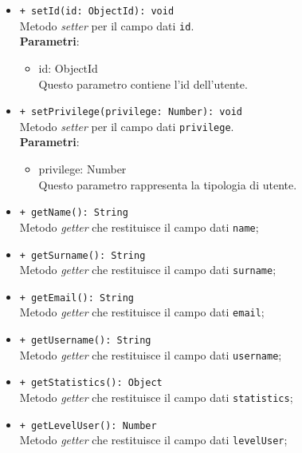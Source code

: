 \begin{itemize}
\begin{itemize}
				\item \texttt{+ setId(id: ObjectId): void} \\
				Metodo \textit{setter} per il campo dati \texttt{id}.\\
				\textbf{Parametri}:
				\begin{itemize}
					\item {id: ObjectId}\\
					Questo parametro contiene l'id dell'utente.
				\end{itemize}
				
				\item \texttt{+ setPrivilege(privilege: Number): void} \\
				Metodo \textit{setter} per il campo dati \texttt{privilege}.\\
				\textbf{Parametri}:
				\begin{itemize}
					\item {privilege: Number}\\
					Questo parametro rappresenta la tipologia di utente.
				\end{itemize}
				
				\item \texttt{+ getName(): String} \\
				Metodo \textit{getter} che restituisce il campo dati \texttt{name};
				
				\item \texttt{+ getSurname(): String} \\
				Metodo \textit{getter} che restituisce il campo dati \texttt{surname};
				
				\item \texttt{+ getEmail(): String} \\
				Metodo \textit{getter} che restituisce il campo dati \texttt{email};
				
				\item \texttt{+ getUsername(): String} \\
				Metodo \textit{getter} che restituisce il campo dati \texttt{username};
				
				\item \texttt{+ getStatistics(): Object} \\
				Metodo \textit{getter} che restituisce il campo dati \texttt{statistics};
				
				\item \texttt{+ getLevelUser(): Number} \\
				Metodo \textit{getter} che restituisce il campo dati \texttt{levelUser};
				

\end{itemize}
\end{itemize}

